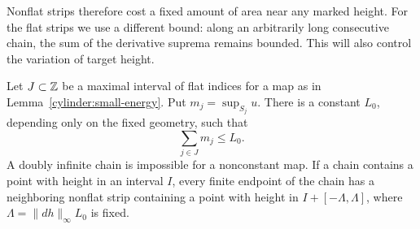 Nonflat strips therefore cost a fixed amount of area near any marked
height. For the flat strips we use a different bound: along an
arbitrarily long consecutive chain, the sum of the derivative suprema
remains bounded. This will also control the variation of target height.

\begin{lemma}
\label{cylinder:flat-chains}
Let $J\subset\mathbb Z$ be a maximal interval of flat indices for a map as
in Lemma~\ref{cylinder:small-energy}.  Put $m_j=\sup_{S_j}u$.
There is a constant $L_0$, depending only on the fixed geometry,
such that
\begin{equation}\label{cylinder:chain-sum}
 \sum_{j\in J}m_j\leq L_0.
\end{equation}
A doubly infinite chain is impossible for a nonconstant map.  If a
chain contains a point with height in an interval $I$, every finite
endpoint of the chain has a neighboring nonflat strip containing a
point with height in $I+[-\Lambda,\Lambda]$, where
$\Lambda=\|dh\|_\infty L_0$ is fixed.
\end{lemma}

